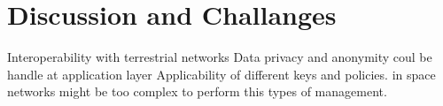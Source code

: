 \section{Discussion and Challanges}

Interoperability with terrestrial networks
Data privacy and anonymity coul be handle at application layer
Applicability of different keys and policies. in space networks might be too complex to perform this types of management. 